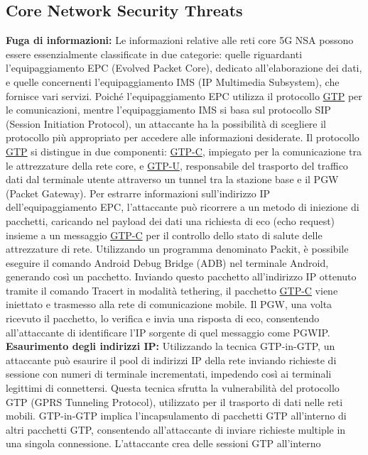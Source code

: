 \documentclass[english]{article}
\begin{document}
\subsection{Core Network Security Threats}
\textbf{Fuga di informazioni:}
Le informazioni relative alle reti core 5G NSA possono essere essenzialmente
classificate in due categorie: quelle riguardanti l'equipaggiamento EPC (Evolved Packet Core),
dedicato all'elaborazione dei dati, e quelle concernenti l'equipaggiamento IMS (IP Multimedia Subsystem),
che fornisce vari servizi. Poiché l'equipaggiamento EPC utilizza il protocollo
\hyperlink{GTP}{GTP} per le comunicazioni,
mentre l'equipaggiamento IMS si basa sul protocollo SIP (Session Initiation Protocol),
un attaccante ha la possibilità di scegliere il protocollo più appropriato per accedere
alle informazioni desiderate.
Il protocollo \hyperlink{GTP}{GTP} si distingue in due componenti: \hyperlink{GTP}{GTP-C},
impiegato per la comunicazione tra le attrezzature della rete core, e \hyperlink{GTP}{GTP-U},
responsabile del trasporto del traffico dati dal terminale utente attraverso
un tunnel tra la stazione base e il PGW (Packet Gateway). Per estrarre informazioni
sull'indirizzo IP dell'equipaggiamento EPC, l'attaccante può ricorrere a un metodo di
iniezione di pacchetti, caricando nel payload dei dati una richiesta di eco (echo request)
insieme a un messaggio \hyperlink{GTP}{GTP-C} per il controllo dello stato di salute delle attrezzature di rete.
Utilizzando un programma denominato Packit, è possibile eseguire il comando
Android Debug Bridge (ADB) nel terminale Android, generando così un pacchetto.
Inviando questo pacchetto all'indirizzo IP ottenuto tramite il comando Tracert in modalità tethering,
il pacchetto \hyperlink{GTP}{GTP-C} viene iniettato e trasmesso alla rete di comunicazione mobile.
Il PGW, una volta ricevuto il pacchetto, lo verifica e invia una risposta di eco,
consentendo all'attaccante di identificare l'IP sorgente di quel messaggio come PGWIP.\@
\\[0.2cm]
\textbf{Esaurimento degli indirizzi IP:} Utilizzando la tecnica GTP-in-GTP, un attaccante 
può esaurire il pool di indirizzi IP della rete inviando richieste di sessione con numeri
 di terminale incrementati, impedendo così ai terminali legittimi di connettersi.
  Questa tecnica sfrutta la vulnerabilità del protocollo GTP (GPRS Tunneling Protocol), 
  utilizzato per il trasporto di dati nelle reti mobili. GTP-in-GTP implica l'incapsulamento 
  di pacchetti GTP all'interno di altri pacchetti GTP, consentendo all'attaccante di inviare 
  richieste multiple in una singola connessione. L'attaccante crea delle sessioni GTP all'interno
\end{document}
